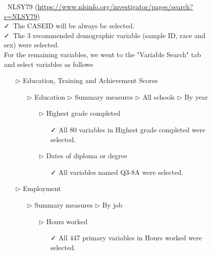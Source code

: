 \documentclass[12pt]{article}
\begin{document}
\begin{figure}[t]

\begin{tcolorbox}[title = Navigating the data source]
\faDatabase\ NLSY79 (\url{https://www.nlsinfo.org/investigator/pages/search?s=NLSY79})\\
\vspace{1mm}
\faCheck\ The CASEID will be always be selected.  \\
\vspace{1mm}
\faCheck\ The 3 recommended demographic variable (sample ID, race and sex) were selected.  \\
\vspace{1mm}
For the remaining variables, we went to the "Variable Search" tab and select variables as follows
\begin{itemize}
\item[$\triangleright$] Education, Training and Achievement Scores
\begin{itemize}
\item[$\triangleright$] Education $\triangleright$ Summary measures $\triangleright$ All schools $\triangleright$ By year
\begin{itemize}
\item[$\triangleright$] Highest grade completed
\begin{itemize}
\item[\faCheck] All 80 variables in Highest grade completed were selected.
\end{itemize}
\end{itemize}
\begin{itemize}
\item[$\triangleright$] Dates of diploma or degree
\begin{itemize}
\item[\faCheck] All variables named Q3-8A were selected.
\end{itemize}
\end{itemize}
\end{itemize}
\item[$\triangleright$] Employment
\begin{itemize}
\item[$\triangleright$] Summary measures $\triangleright$ By job
\begin{itemize}
\item[$\triangleright$] Hours worked  
\begin{itemize}
\item[\faCheck] All 447 primary variables in Hours worked were selected.

\end{itemize}
\end{itemize}
\end{itemize}
\end{itemize}
\end{tcolorbox}
\end{figure}
\end{document}
